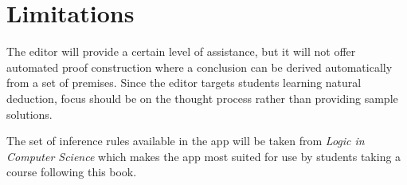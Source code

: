 \section {Limitations}

The editor will provide a certain level of assistance, but it will not offer automated proof construction where a conclusion can be derived automatically from a set of premises. Since the editor targets students learning natural deduction, focus should be on the thought process rather than providing sample solutions.

The set of inference rules available in the app will be taken from \textit{Logic in Computer Science} \cite{huth_ryan_2018} which makes the app most suited for use by students taking a course following this book.